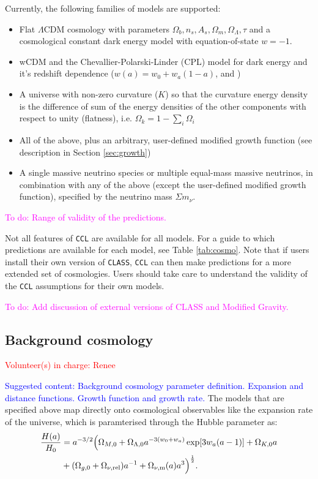 \documentclass[\docopts]{\docclass}
\newcommand{\todo}[1]{\textcolor{magenta}{To do: #1}}
\newcommand{\vol}[1]{\textcolor{red}{Volunteer(s) in charge: #1}}
\newcommand{\cont}[1]{\textcolor{blue}{Suggested content: #1}}
\newcommand{\ccl}{{\tt CCL}\xspace}
\begin{document}
Currently, the following families of models are supported:
\begin{itemize}
 \item Flat $\Lambda$CDM cosmology with parameters $\Omega_b, n_s, A_s, \Omega_m, \Omega_\Lambda, \tau$ and a cosmological constant dark energy model with equation-of-state $w=-1.$
 \item wCDM and the Chevallier-Polarski-Linder (CPL) model for dark energy and it's redshift dependence ($w(a) = w_0+w_a(1-a)$, \citealt{Chevallier01} and \citealt{Linder03})
 \item A universe with non-zero curvature ($K$) so that the curvature energy density is the difference of sum of the energy densities of the other components with respect to unity (flatness), i.e. $\Omega_k = 1- \sum_i \Omega_i$
 \item All of the above, plus an arbitrary, user-defined modified growth function (see description in Section \ref{sec:growth})
  \item A single massive neutrino species or multiple equal-mass massive neutrinos, in combination with any of the above (except the user-defined modified growth function), specified by the neutrino mass $\Sigma m_\nu$.
\end{itemize}

\todo{Range of validity of the predictions.}

Not all features of \ccl are available for all models. For a guide to which predictions are available for each model, see Table \ref{tab:cosmo}. Note that if users install their own version of {\tt CLASS}, {\tt CCL} can then make predictions for a more extended set of cosmologies. Users should take care to understand the validity of the {\tt CCL} assumptions for their own models.



\todo{Add discussion of external versions of CLASS and Modified Gravity.}

\subsection{Background cosmology}
\vol{Renee}

\cont{Background cosmology parameter definition. Expansion and distance functions. Growth function and growth rate.}
The models that are specified above map directly onto cosmological observables like the expansion rate of the universe, which is paramterised through the Hubble parameter as:
\begin{align}\label{eq:Ha}
\frac{H(a)}{H_0} &= a^{-3/2}\Big(\Omega_{M,0}+\Omega_{\Lambda,0} a^{-3(w_0+w_a)}
    \exp[3 w_a (a-1)]+\Omega_{K,0} a \nonumber \\ &+(\Omega_{g,0} + \Omega_{\nu, {\rm rel}}) a^{-1} + \Omega_{\nu, {\rm m}}(a)a^3\Big)^{\frac{1}{2}}.
\end{align}
\end{document}
